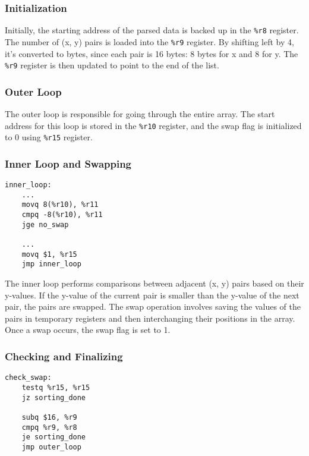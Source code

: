 \documentclass[12pt,a4paper]{article}
\begin{document}
\subsubsection{Initialization}

Initially, the starting address of the parsed data is backed up in the \texttt{\%r8} register. The number of (x, y) pairs is loaded into the \texttt{\%r9} register. By shifting left by 4, it's converted to bytes, since each pair is 16 bytes: 8 bytes for x and 8 for y. The \texttt{\%r9} register is then updated to point to the end of the list.

\subsubsection{Outer Loop}

The outer loop is responsible for going through the entire array. The start address for this loop is stored in the \texttt{\%r10} register, and the swap flag is initialized to 0 using \texttt{\%r15} register.

\subsubsection{Inner Loop and Swapping}

\begin{verbatim}
inner_loop:
    ...
    movq 8(%r10), %r11         
    cmpq -8(%r10), %r11        
    jge no_swap                

    ...
    movq $1, %r15              
    jmp inner_loop             
\end{verbatim}

The inner loop performs comparisons between adjacent (x, y) pairs based on their y-values. If the y-value of the current pair is smaller than the y-value of the next pair, the pairs are swapped. The swap operation involves saving the values of the pairs in temporary registers and then interchanging their positions in the array. Once a swap occurs, the swap flag is set to 1.

\subsubsection{Checking and Finalizing}

\begin{verbatim}
check_swap:
    testq %r15, %r15           
    jz sorting_done            

    subq $16, %r9              
    cmpq %r9, %r8              
    je sorting_done
    jmp outer_loop             
\end{verbatim}
\end{document}
